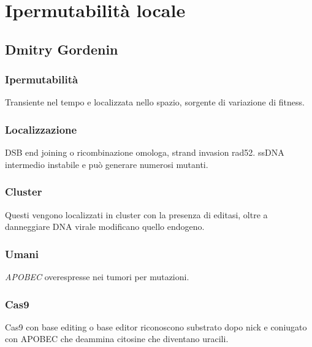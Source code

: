 \chapter{Ipermutabilit\`a locale}

\section{Dmitry Gordenin}

	\subsection{Ipermutabilit\`a}
	Transiente nel tempo e localizzata nello spazio, sorgente di variazione di fitness.

	\subsection{Localizzazione}
	DSB end joining o ricombinazione omologa, strand invasion rad52.
	ssDNA intermedio instabile e pu\`o generare numerosi mutanti.

	\subsection{Cluster}
	Questi vengono localizzati in cluster con la presenza di editasi, oltre a danneggiare DNA virale modificano quello endogeno.

	\subsection{Umani}
	\emph{APOBEC} overespresse nei tumori per mutazioni.

	\subsection{Cas9}
	Cas9 con base editing o base editor riconoscono substrato dopo nick e coniugato con APOBEC che deammina citosine che diventano uracili.
